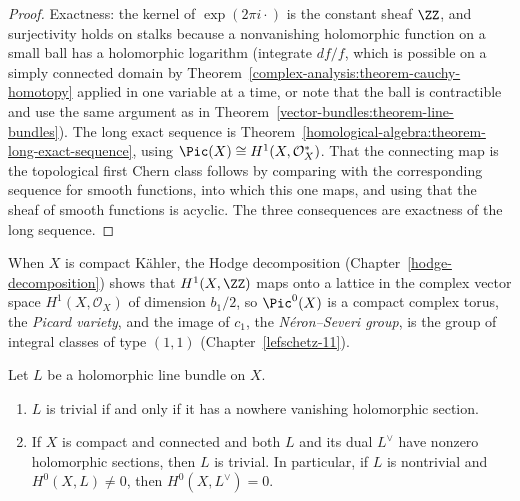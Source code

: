 \begin{proof}
Exactness: the kernel of $\exp(2\pi i \cdot)$ is the constant sheaf $\ZZ$, and surjectivity holds on stalks because a nonvanishing holomorphic function on a small ball has a holomorphic logarithm (integrate
$df/f$, which is possible on a simply connected domain by Theorem~\ref{complex-analysis:theorem-cauchy-homotopy} applied in one variable at a time, or note that the ball is contractible and use the same
argument as in Theorem~\ref{vector-bundles:theorem-line-bundles}). The long exact sequence is Theorem~\ref{homological-algebra:theorem-long-exact-sequence}, using
$\Pic(X) \cong H^1(X, \mathcal{O}_X^*)$. That the connecting map is the topological first Chern class follows by comparing with the corresponding sequence for smooth functions, into which this one maps, and
using that the sheaf of smooth functions is acyclic. The three consequences are exactness of the long sequence.
\end{proof}

\begin{remark}\label{holomorphic-bundles:remark-picard-variety}
When $X$ is compact K\"ahler, the Hodge decomposition (Chapter~\ref{hodge-decomposition}) shows that $H^1(X, \ZZ)$ maps onto a lattice in the complex vector space $H^1(X, \mathcal{O}_X)$ of dimension
$b_1/2$, so $\Pic^0(X)$ is a compact complex torus, the \emph{Picard variety}, and the image of $c_1$, the \emph{N\'eron--Severi group}, is the group of integral classes of type $(1,1)$
(Chapter~\ref{lefschetz-11}).
\end{remark}

\begin{lemma}\label{holomorphic-bundles:lemma-trivial-sections}
Let $L$ be a holomorphic line bundle on $X$.
\begin{enumerate}
\item $L$ is trivial if and only if it has a nowhere vanishing holomorphic section.
\item If $X$ is compact and connected and both $L$ and its dual $L^\vee$ have nonzero holomorphic sections, then $L$ is trivial. In particular, if $L$ is nontrivial and $H^0(X, L) \neq 0$, then
$H^0(X, L^\vee) = 0$.
\end{enumerate}
\end{lemma}

